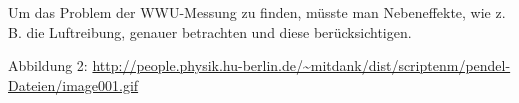 \documentclass[11pt,a4paper,titlepage, ngerman]{article}
\begin{document}
		Um das Problem der WWU-Messung zu finden, müsste man Nebeneffekte, wie z. B. die Luftreibung, genauer betrachten und diese berücksichtigen.
				
		\newpage
		
		\begin{thebibliography}{9}		
			\item[Abbildung 2:] \url{http://people.physik.hu-berlin.de/~mitdank/dist/scriptenm/pendel-Dateien/image001.gif}			
		\end{thebibliography}	
			
\end{document}
